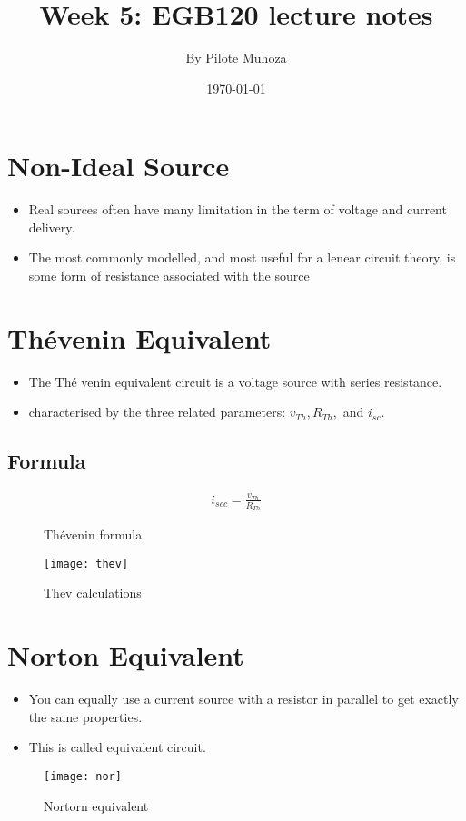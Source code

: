 \documentclass[11pt,a4paper, twocolumn]{article}
\title{\textbf{Week 5: EGB120 lecture notes }}
\author{By Pilote Muhoza}
\date{\today}
\begin{document}
\maketitle
\section{Non-Ideal Source}
\begin{itemize}
\item Real sources often have many limitation in the term of voltage and current delivery.
\item The most commonly modelled, and most useful for a lenear circuit theory, is some form of resistance associated with the source
\end{itemize}


\section {Th\'{e}venin Equivalent}
\begin{itemize}

\item The Th\'{e} venin equivalent circuit is a voltage source with  series resistance.
\item characterised by the three related parameters: $v_{Th}, R_{Th}, $ and $i_{sc}$.
\end{itemize}


	\subsection{Formula}
	\begin{figure}[!h]
		\begin{align}
	i_{scc}=\frac{v_{Th}}{R_{Th}}
	\end{align}
	\caption{Th\'{e}venin formula}
	\end{figure}

	
\begin{figure}[!h]
	\centering
	\texttt{[image: thev]}
	\caption{{Thev calculations}}
\end{figure}
\newpage
\section{Norton Equivalent}
\begin{itemize}
\item You can equally use a current source with a resistor in parallel to get exactly the same properties.
\item This is called equivalent circuit.

	\end{itemize}
	\begin{figure}[!h]
	\centering
	\texttt{[image: nor]}
	\caption{Nortorn equivalent}
	\end{figure}
\end{document}
